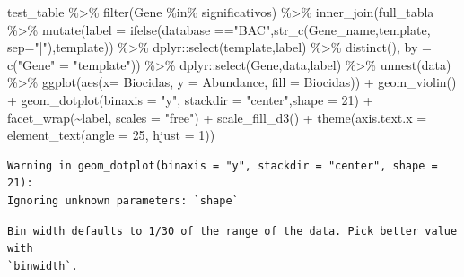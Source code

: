 \documentclass[
  letterpaper,
  DIV=11,
  numbers=noendperiod]{scrartcl}
\newenvironment{Shaded}{\begin{snugshade}}{\end{snugshade}}
\newcommand{\AttributeTok}[1]{\textcolor[rgb]{0.40,0.45,0.13}{#1}}
\newcommand{\DecValTok}[1]{\textcolor[rgb]{0.68,0.00,0.00}{#1}}
\newcommand{\FunctionTok}[1]{\textcolor[rgb]{0.28,0.35,0.67}{#1}}
\newcommand{\NormalTok}[1]{\textcolor[rgb]{0.00,0.23,0.31}{#1}}
\newcommand{\OtherTok}[1]{\textcolor[rgb]{0.00,0.23,0.31}{#1}}
\newcommand{\SpecialCharTok}[1]{\textcolor[rgb]{0.37,0.37,0.37}{#1}}
\newcommand{\StringTok}[1]{\textcolor[rgb]{0.13,0.47,0.30}{#1}}
\begin{document}
\begin{Shaded}
\begin{Highlighting}[]
\NormalTok{test\_table }\SpecialCharTok{\%\textgreater{}\%} 
  \FunctionTok{filter}\NormalTok{(Gene }\SpecialCharTok{\%in\%}\NormalTok{ significativos) }\SpecialCharTok{\%\textgreater{}\%} 
  \FunctionTok{inner\_join}\NormalTok{(full\_tabla }\SpecialCharTok{\%\textgreater{}\%} 
               \FunctionTok{mutate}\NormalTok{(}\AttributeTok{label =} \FunctionTok{ifelse}\NormalTok{(database }\SpecialCharTok{==}\StringTok{"BAC"}\NormalTok{,}\FunctionTok{str\_c}\NormalTok{(Gene\_name,template, }\AttributeTok{sep=}\StringTok{"|"}\NormalTok{),template)) }\SpecialCharTok{\%\textgreater{}\%}\NormalTok{ dplyr}\SpecialCharTok{::}\FunctionTok{select}\NormalTok{(template,label) }\SpecialCharTok{\%\textgreater{}\%} \FunctionTok{distinct}\NormalTok{(), }\AttributeTok{by =} \FunctionTok{c}\NormalTok{(}\StringTok{"Gene"} \OtherTok{=} \StringTok{"template"}\NormalTok{)) }\SpecialCharTok{\%\textgreater{}\%} 
\NormalTok{  dplyr}\SpecialCharTok{::}\FunctionTok{select}\NormalTok{(Gene,data,label) }\SpecialCharTok{\%\textgreater{}\%} 
  \FunctionTok{unnest}\NormalTok{(data) }\SpecialCharTok{\%\textgreater{}\%} 
  \FunctionTok{ggplot}\NormalTok{(}\FunctionTok{aes}\NormalTok{(}\AttributeTok{x=}\NormalTok{ Biocidas, }\AttributeTok{y =}\NormalTok{ Abundance, }\AttributeTok{fill =}\NormalTok{ Biocidas)) }\SpecialCharTok{+} 
  \FunctionTok{geom\_violin}\NormalTok{() }\SpecialCharTok{+}
  \FunctionTok{geom\_dotplot}\NormalTok{(}\AttributeTok{binaxis =} \StringTok{"y"}\NormalTok{, }\AttributeTok{stackdir =} \StringTok{"center"}\NormalTok{,}\AttributeTok{shape =} \DecValTok{21}\NormalTok{) }\SpecialCharTok{+}
  \FunctionTok{facet\_wrap}\NormalTok{(}\SpecialCharTok{\textasciitilde{}}\NormalTok{label, }\AttributeTok{scales =} \StringTok{"free"}\NormalTok{) }\SpecialCharTok{+}
  \FunctionTok{scale\_fill\_d3}\NormalTok{() }\SpecialCharTok{+} 
  \FunctionTok{theme}\NormalTok{(}\AttributeTok{axis.text.x =} \FunctionTok{element\_text}\NormalTok{(}\AttributeTok{angle =} \DecValTok{25}\NormalTok{, }\AttributeTok{hjust =} \DecValTok{1}\NormalTok{))}
\end{Highlighting}
\end{Shaded}

\begin{verbatim}
Warning in geom_dotplot(binaxis = "y", stackdir = "center", shape = 21):
Ignoring unknown parameters: `shape`
\end{verbatim}

\begin{verbatim}
Bin width defaults to 1/30 of the range of the data. Pick better value with
`binwidth`.
\end{verbatim}
\end{document}
